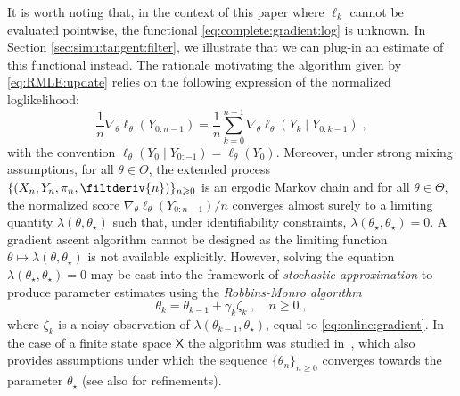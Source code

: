\documentclass[12pt]{article}
\newcommand{\logllh}[1]{\ell_{#1}}
\newcommand{\pred}[1]{\pi_{#1}}
\newcommand{\parvec}{\theta}
\newcommand{\parspace}{\Theta}
\newcommand{\deriv}{\nabla_{\parvec}}
\newcommand{\set}[1]{\mathsf{#1}}
\newcommand{\eqsp}{\;}
\newcommand{\qg}[1]{\ell_{#1}}
\begin{document}
It is worth noting that, in the context of this paper where $\qg{k}$ cannot be evaluated pointwise,  the functional \eqref{eq:complete:gradient:log} is unknown.  
In Section \ref{sec:simu:tangent:filter}, we illustrate that we can plug-in an estimate of this functional instead. 
The rationale motivating the algorithm given by \eqref{eq:RMLE:update} relies on the following expression of the normalized loglikelihood:
$$
\frac{1}{n} \deriv \logllh{\parvec}(Y_{0:n-1}) = \frac{1}{n} \sum_{k = 0}^{n-1} \deriv \logllh{\parvec}\left(Y_k \mid Y_{0:k - 1}\right)\eqsp,$$
with the convention $ \logllh{\parvec}(Y_0 \mid Y_{0:-1}) = \logllh{\parvec}(Y_0)$. Moreover, under strong mixing assumptions, for all  $\parvec \in \parspace$, the extended process $\{ (X_n, Y_n, \pred{n}, \filtderiv{n}) \}_{n \geqslant 0}$ is an ergodic Markov chain and for all $\parvec \in \parspace$, the normalized score $\deriv \logllh{\parvec}(Y_{0:n-1})/n$  converges almost surely to a limiting quantity $\lambda(\parvec, \parvec_{\star})$ such that, under identifiability constraints, $\lambda(\parvec_{\star}, \parvec_{\star}) = 0$. 
A gradient ascent algorithm cannot be designed as the limiting function $\parvec \mapsto \lambda(\parvec, \parvec_{\star})$ is not available explicitly. 
However, solving the equation $\lambda(\parvec_{\star}, \parvec_{\star}) = 0$ may be cast into the framework of \emph{stochastic approximation} to produce parameter estimates using the \emph{Robbins-Monro algorithm}
\begin{equation}
\label{eq:par:update}
\parvec_{k} = \parvec_{k - 1} + \gamma_{k} \zeta_{k}\eqsp, \quad n\geqslant 0\eqsp, 
\end{equation}
where $\zeta_{k}$ is a noisy observation of $\lambda(\parvec_{k - 1}, \parvec_{\star})$, equal to \eqref{eq:online:gradient}.  
In the case of a finite state space $\set{X}$ the algorithm was studied in~\cite{legland1997recursive}, which also provides assumptions under which the sequence $\{\parvec_{n}\}_{n\geqslant 0}$ converges towards the parameter $\parvec_{\star}$ (see also \cite{tadic2010analyticity} for refinements). 
\end{document}
